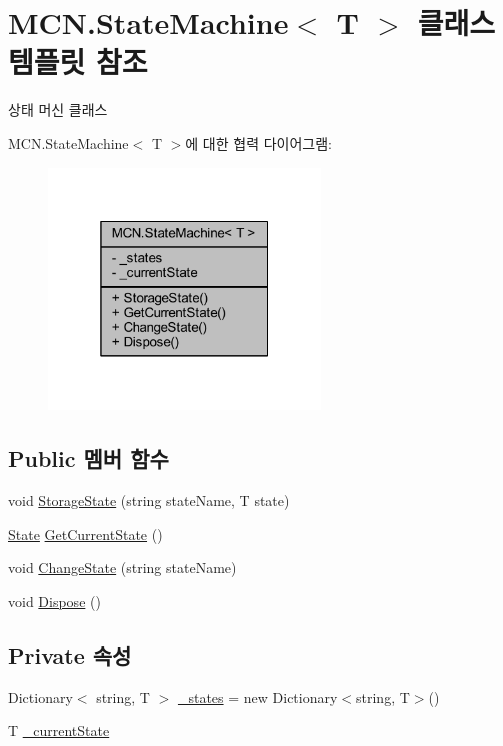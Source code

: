 \hypertarget{class_m_c_n_1_1_state_machine}{}\section{M\+C\+N.\+State\+Machine$<$ T $>$ 클래스 템플릿 참조}
\label{class_m_c_n_1_1_state_machine}


상태 머신 클래스  




M\+C\+N.\+State\+Machine$<$ T $>$에 대한 협력 다이어그램\+:\nopagebreak
\begin{figure}[H]
\begin{center}
\leavevmode
\includegraphics[width=205pt]{class_m_c_n_1_1_state_machine__coll__graph}
\end{center}
\end{figure}
\subsection*{Public 멤버 함수}
\begin{DoxyCompactItemize}
\item 
void \hyperlink{class_m_c_n_1_1_state_machine_a30d168379929d5bdb050f211e6273a8b}{Storage\+State} (string state\+Name, T state)
\item 
\hyperlink{class_m_c_n_1_1_state}{State} \hyperlink{class_m_c_n_1_1_state_machine_a9c40c6eb8f992b4f7a2d81415376fd56}{Get\+Current\+State} ()
\item 
void \hyperlink{class_m_c_n_1_1_state_machine_a81eb33948ad947f9ef9c0771542a8c47}{Change\+State} (string state\+Name)
\item 
void \hyperlink{class_m_c_n_1_1_state_machine_a19c64816c4a7701a5e8658ab786a1615}{Dispose} ()
\end{DoxyCompactItemize}
\subsection*{Private 속성}
\begin{DoxyCompactItemize}
\item 
Dictionary$<$ string, T $>$ \hyperlink{class_m_c_n_1_1_state_machine_adf0f1417aacb073306b88563e7b3d740}{\+\_\+states} = new Dictionary$<$string, T$>$()
\item 
T \hyperlink{class_m_c_n_1_1_state_machine_a040bf7c13d5127fe983af2ef0a6315ec}{\+\_\+current\+State}
\end{DoxyCompactItemize}


